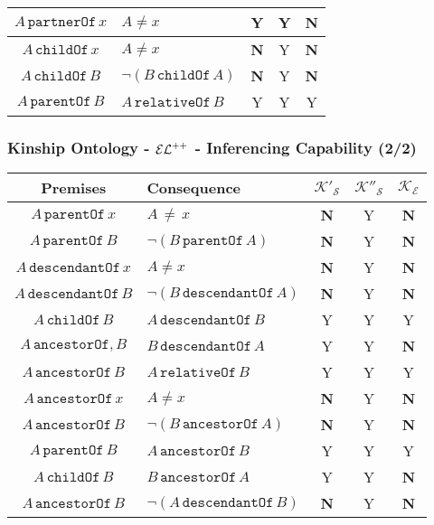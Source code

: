 \documentclass[8pt]{beamer}
\newcommand{\relative}{\mathtt{relativeOf}}
\newcommand{\partner}{\mathtt{partnerOf}}
\newcommand{\child}{\mathtt{childOf}}
\newcommand{\parent}{\mathtt{parentOf}}
\newcommand{\ancestor}{\mathtt{ancestorOf}}
\newcommand{\descendant}{\mathtt{descendantOf}}
\newcommand{\Alice}{A}
\newcommand{\Bob}{B}
\newcommand{\KBtra}{\mathcal{K}'_{\mathcal{S}}}
\newcommand{\KBirr}{\mathcal{K}''_{\mathcal{S}}}
\newcommand{\KBel}{\mathcal{K_E}}
\newcommand{\testpassed}{\textsf{Y}}
\newcommand{\testfailed}{\bf{\textsf{N}}}
\begin{document}
\begin{frame}
\begin{center}
\begin{small}
\begin{tabular}{|c|l|c|c|c|}
\hline
$\Alice\,\partner\,x$ & $\Alice\neq x$ & \testpassed & \testpassed & \testfailed \\
\hline
$\Alice\,\child\,x$ & $\Alice \neq x$ & \testfailed & \testpassed & \testfailed \\
\hline
$\Alice\,\child\,\Bob$ & $\neg ( \Bob\,\child\,\Alice)$ & \testfailed & \testpassed & \testfailed \\
\hline
$\Alice\,\parent\,\Bob$ & $\Alice\,\relative\,\Bob$ & \testpassed & \testpassed & \testpassed \\
\hline
\end{tabular}
\end{small}
\end{center}
\end{frame}

\begin{frame}
\frametitle{Kinship Ontology - $\mathcal{EL}^{++}$ - Inferencing Capability (2/2)}
\begin{center}
\begin{small}
\begin{tabular}{|c|l|c|c|c|}
\hline
\bf{Premises} & \bf{Consequence} & $\KBtra$ & $\KBirr$ & $\KBel$\\
\hline
$\Alice\,\parent\,x$ & $\Alice\,\neq\,x$ & \testfailed & \testpassed & \testfailed \\
\hline
$\Alice\,\parent\,\Bob$ & $\neg( \Bob\,\parent\,\Alice )$ & \testfailed & \testpassed & \testfailed \\
\hline
$\Alice\,\descendant\,x$ & $\Alice \neq x$ & \testfailed & \testpassed & \testfailed \\
\hline
$\Alice\,\descendant\,\Bob$ & $\neg( \Bob\,\descendant\,\Alice )$ & \testfailed & \testpassed & \testfailed \\
\hline
$\Alice\,\child\,\Bob$ & $\Alice\,\descendant\,\Bob$ & \testpassed & \testpassed & \testpassed \\
\hline
$\Alice\,\ancestor,\Bob$ & $\Bob\,\descendant\,\Alice$ & \testpassed & \testpassed & \testfailed \\
\hline
$\Alice\,\ancestor\,\Bob$ & $\Alice\,\relative\,\Bob$ & \testpassed & \testpassed & \testpassed \\
\hline
$\Alice\,\ancestor\,x$ & $\Alice \neq x$& \testfailed & \testpassed & \testfailed \\
\hline
$\Alice\,\ancestor\,\Bob$ & $\neg( \Bob\,\ancestor\,\Alice )$& \testfailed & \testpassed & \testfailed \\
\hline
$\Alice\,\parent\,\Bob$ & $\Alice\,\ancestor\,\Bob$& \testpassed & \testpassed & \testpassed \\
\hline
$\Alice\,\child\,\Bob$ & $\Bob\,\ancestor\,\Alice$ & \testpassed & \testpassed & \testfailed \\
\hline
$\Alice\,\ancestor\,\Bob$ & $\neg( \Alice\,\descendant\,\Bob )$ & \testfailed & \testpassed & \testfailed \\
\hline
\end{tabular}
\end{small}
\end{center}
\end{frame}
\end{document}
